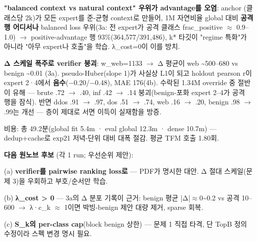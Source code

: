 \par\noindent \textbullet\enspace \textbf{"balanced context vs natural context" 우위가 advantage를 오염}: anchor (클래스당 2k)가 모든 expert를 준-균형 context로 만들어, 1M 자연비율 global 대비 \textbf{공격 행 어디서나} balanced loss 우위(3a: 전 expert가 공격 클래스 frac\_\allowbreak{}positive \ensuremath{\approx} 0.9–1.0)  \ensuremath{\rightarrow}  positive-advantage 행 93\%(364,577/\allowbreak{}391,486), k* 타깃이 "regime 특화"가 아니라 "아무 expert나 호출"을 학습. λ\_\allowbreak{}cost=\allowbreak{}0이 이를 방치.


\par\noindent \textbullet\enspace \textbf{Δ 스케일 폭주로 verifier 붕괴}: w\_\allowbreak{}web=\allowbreak{}1133  \ensuremath{\rightarrow}  Δ 평균이 web \textasciitilde{}500–680 vs benign \textasciitilde{}0.01 (3a). pseudo-Huber(slope 1)가 사실상 L1이 되고 holdout pearson r이 expert 2·4에서 \textbf{음수}(−0.20/\allowbreak{}−0.48), MAE 176(4b). 수락된 1.34M override 중 절반이 유해 — brute .72 \ensuremath{\rightarrow} .40, inf .42 \ensuremath{\rightarrow} .14 붕괴(benign-포화 expert 2–4가 공격 행을 잠식). 반면 ddos .91 \ensuremath{\rightarrow} .97, dos .51 \ensuremath{\rightarrow} .74, web .16 \ensuremath{\rightarrow} .20, benign .98 \ensuremath{\rightarrow} .99는 개선 — 층이 제대로 서면 이득이 실재함을 방증.


\par\noindent \textbullet\enspace 비용: 총 49.2분(global fit 5.4m · eval global 12.3m · dense 10.7m) — dedup+\allowbreak{}cache로 exp21 저녁-단위 대비 대폭 절감. 평균 TFM 호출 1.80회.


\textbf{다음 원노브 후보} (각 1 run; 우선순위 제안):

\par\noindent \textbullet\enspace (a) \textbf{verifier를 pairwise ranking loss로} — PDF가 명시한 대안. Δ 절대 스케일(문제 3)을 우회하고 부호/\allowbreak{}순서만 학습.


\par\noindent \textbullet\enspace (b) \textbf{λ\_\allowbreak{}cost > 0} — 3a의 Δ 분포 기록이 근거: benign 평균 |Δ|\ensuremath{\approx}0\textasciitilde{}0.2 vs 공격 10–600  \ensuremath{\rightarrow}  λ·c\_\allowbreak{}k \ensuremath{\approx} 1이면 박빙-benign 제안 대량 제거, sparse 회복.


\par\noindent \textbullet\enspace (c) \textbf{S\_\allowbreak{}k의 per-class cap}(block benign 상한) — 문제 1 직접 타격, 단 TopB 정의 수정이라 스펙 변경 명시 필요.


